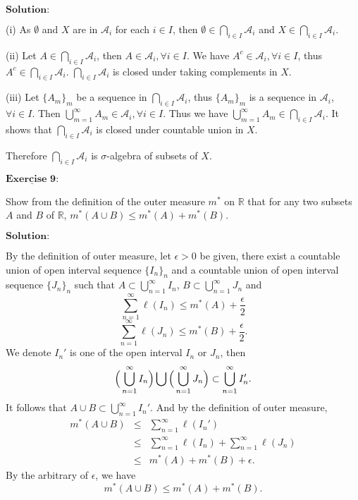\documentclass[12pt,a4paper]{ctexart}
\begin{document}
\vspace{8pt}
$\textbf{Solution:}$

(i) As $\emptyset$ and $X$ are in $\mathcal A_i$ for each $i \in I$, then $\emptyset \in \bigcap_{i \in I} \mathcal A_i$ and $X \in \bigcap_{i \in I} \mathcal A_i$.

(ii) Let $A \in \bigcap_{i \in I} \mathcal A_i$, then $A \in \mathcal A_i, \forall i \in I$. We have $A^c \in \mathcal A_i, \forall i \in I$, thus $A^c \in \bigcap_{i \in I} \mathcal A_i$. $\bigcap_{i \in I} \mathcal A_i$ is closed under taking complements in $X$.

(iii) Let $\{A_m\}_{m}$ be a sequence in $\bigcap_{i \in I} \mathcal A_i$, thus $\{A_m\}_{m}$ is a sequence in $\mathcal A_i$, $\forall i \in I$. Then $\bigcup_{m=1}^{\infty} A_m \in \mathcal A_i, \forall i \in I$. Thus we have $\bigcup_{m=1}^{\infty} A_m \in \bigcap_{i \in I} \mathcal A_i$. It shows that $\bigcap_{i \in I} \mathcal A_i$ is closed under countable union in $X$.

Therefore $\bigcap_{i \in I} \mathcal A_i$ is $\sigma$-algebra of subsets of $X$.


\newpage

$\underline{\textbf{Exercise 9:}}$

Show from the definition of the outer measure $m^*$ on $\mathbb R$ that for any two subsets $A$ and $B$ of $\mathbb R$, $m^{*} (A \cup B) \leq  m^{*} (A) + m^{*} (B)$.

\vspace{8pt}
$\textbf{Solution:}$

By the definition of outer measure, let $\epsilon > 0$ be given, there exist a countable union of open interval sequence $\{I_n\}_n$ and a countable union of open interval sequence $\{J_n\}_n$ such that
$A \subset \bigcup_{n=1}^{\infty} I_n$, $B \subset \bigcup_{n=1}^{\infty} J_n$ and
$$\sum_{n=1}^{\infty} \ell (I_n) \leq m^{*}(A) + \frac{\epsilon}{2}$$
$$\sum_{n=1}^{\infty} \ell (J_n) \leq m^{*}(B) + \frac{\epsilon}{2}.$$
We denote $I_n'$ is one of the open interval $I_n$ or $J_n$, then 
$$\Big{(} \bigcup_{n=1}^{\infty} I_n \Big{)} \bigcup \Big{(} \bigcup_{n=1}^{\infty} J_n \Big{)} \subset \bigcup_{n=1}^{\infty} I_n' .$$
It follows that $A \cup B \subset \bigcup_{n=1}^{\infty} I_n'$. And by the definition of outer measure,
\begin{eqnarray*}
 m^{*}(A \cup B) &\leq& \sum_{n=1}^{\infty} \ell (I_n') \\
& \leq & \sum_{n=1}^{\infty} \ell (I_n) + \sum_{n=1}^{\infty} \ell (J_n) \\
& \leq & m^{*}(A) + m^{*}(B) + \epsilon.
\end{eqnarray*}
By the arbitrary of $\epsilon$, we have
$$m^{*}(A \cup B) \leq m^{*}(A) + m^{*}(B).$$
\end{document}
